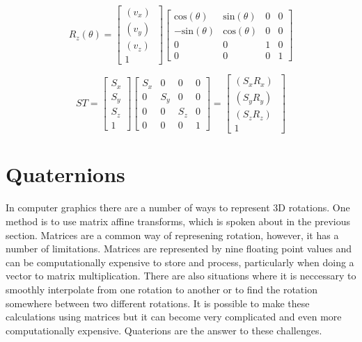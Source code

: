 \begin{equation}
R_z(\theta) = 
\begin{bmatrix}
(v_x)~ \\
(v_y)~ \\
(v_z)~ \\
1
\end{bmatrix}
\begin{bmatrix}
\text{cos}(\theta) 	& \text{sin}(\theta) 	& 0						& 0\\
-\text{sin}(\theta) & \text{cos}(\theta) 	& 0
					& 0\\
0 					& 0 					& 1						& 0\\
0 					& 0 					& 0 					& 1
\end{bmatrix}
\end{equation}


\begin{equation}
ST = \begin{bmatrix}
S_{x} \\
S_{y} \\
S_{z} \\
1
\end{bmatrix}
\begin{bmatrix}
S_x & 0 & 0 & 0\\
0 & S_y & 0 & 0\\
0 & 0 & S_z & 0\\
0  & 0  & 0 & 1
\end{bmatrix}
= \begin{bmatrix}
(S_x R_x)~ \\
(S_y R_y)~ \\
(S_z R_z)~ \\
1
\end{bmatrix}
\end{equation}

\section{Quaternions}

In computer graphics there are a number of ways to represent 3D rotations. One method is to use matrix affine transforms, which is spoken about in the previous section. Matrices are a common way of represening rotation, however, it has a number of limitations. Matrices are represented by nine floating point values and can be computationally expensive to store and process, particularly when doing a vector to matrix multiplication. There are also situations where it is neccessary to smoothly interpolate from one rotation to another or to find the rotation somewhere between two different rotations. It is possible to make these calculations using matrices but it can become very complicated and even more computationally expensive. Quaterions are the answer to these challenges.

